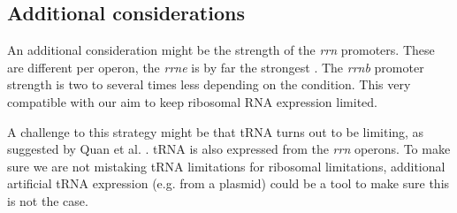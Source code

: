 \subsection{Additional considerations}

An additional consideration might be the strength of the \textit{rrn} promoters.
These are different per operon, the \textit{rrne} is by far the strongest \cite{Maeda2015}.
The \textit{rrnb} promoter strength is two to several times less depending on the condition.
This very compatible with our aim to keep ribosomal RNA expression limited.

A challenge to this strategy might be that 
tRNA turns out to be limiting, as suggested by Quan et al. \cite{Quan2015}.
tRNA is also expressed from the \textit{rrn} operons. To make sure we are not mistaking tRNA limitations for ribosomal limitations, additional artificial tRNA expression (e.g. from a plasmid) could be a tool to make sure this is not the case.



%

